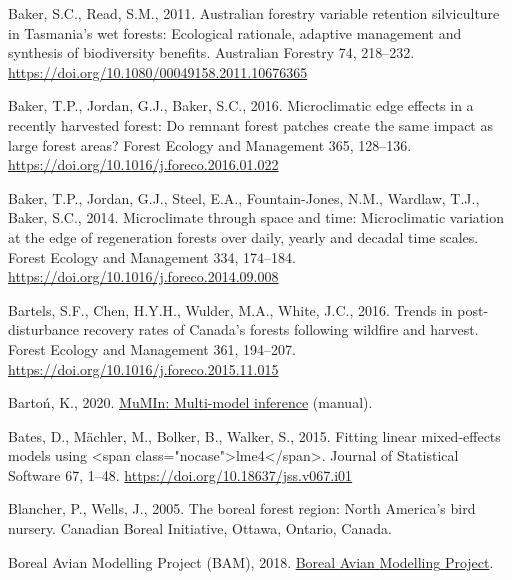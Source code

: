 \documentclass[
  12pt,
]{article}
\newlength{\cslhangindent}
\newlength{\cslentryspacingunit} %
\newenvironment{CSLReferences}[2] %
 {%
  \setlength{\parindent}{0pt}
  \ifodd #1
  \let\oldpar\par
  \def\par{\hangindent=\cslhangindent\oldpar}
  \fi
  \setlength{\parskip}{#2\cslentryspacingunit}
 }%
 {}
\begin{document}
\hypertarget{refs}{}
\begin{CSLReferences}{1}{0}
\leavevmode{}%
Baker, S.C., Read, S.M., 2011. Australian forestry variable retention silviculture in {Tasmania}'s wet forests: Ecological rationale, adaptive management and synthesis of biodiversity benefits. Australian Forestry 74, 218--232. \url{https://doi.org/10.1080/00049158.2011.10676365}

\leavevmode{}%
Baker, T.P., Jordan, G.J., Baker, S.C., 2016. Microclimatic edge effects in a recently harvested forest: {Do} remnant forest patches create the same impact as large forest areas? Forest Ecology and Management 365, 128--136. \url{https://doi.org/10.1016/j.foreco.2016.01.022}

\leavevmode{}%
Baker, T.P., Jordan, G.J., Steel, E.A., Fountain-Jones, N.M., Wardlaw, T.J., Baker, S.C., 2014. Microclimate through space and time: {Microclimatic} variation at the edge of regeneration forests over daily, yearly and decadal time scales. Forest Ecology and Management 334, 174--184. \url{https://doi.org/10.1016/j.foreco.2014.09.008}

\leavevmode{}%
Bartels, S.F., Chen, H.Y.H., Wulder, M.A., White, J.C., 2016. Trends in post-disturbance recovery rates of {Canada}'s forests following wildfire and harvest. Forest Ecology and Management 361, 194--207. \url{https://doi.org/10.1016/j.foreco.2015.11.015}

\leavevmode{}%
Bartoń, K., 2020. \href{https://CRAN.R-project.org/package=MuMIn}{{MuMIn}: {Multi}-model inference} (manual).

\leavevmode{}%
Bates, D., Mächler, M., Bolker, B., Walker, S., 2015. Fitting linear mixed-effects models using {\textless{}}span class="nocase"{\textgreater{}}lme4{\textless{}}/span{\textgreater{}}. Journal of Statistical Software 67, 1--48. \url{https://doi.org/10.18637/jss.v067.i01}

\leavevmode{}%
Blancher, P., Wells, J., 2005. The boreal forest region: {North} {America}'s bird nursery. Canadian Boreal Initiative, Ottawa, Ontario, Canada.

\leavevmode{}%
Boreal Avian Modelling Project (BAM), 2018. \href{http://www.borealbirds.ca/}{Boreal {Avian} {Modelling} {Project}}.


\end{CSLReferences}
\end{document}
